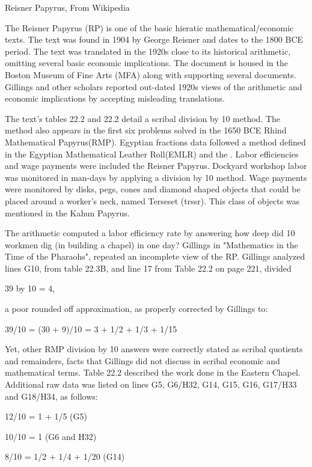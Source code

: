 \documentclass[12pt]{article}
\begin{document}
Reisner Papyrus, From Wikipedia

The Reisner Papyrus (RP) is one of the basic hieratic mathematical/economic texts. The text was found in 1904 by George Reisner and dates to the 1800 BCE period. The text was translated in the 1920s close to its historical arithmetic, omitting several basic economic implications. The document is housed in the Boston Museum of Fine Arts (MFA) along with supporting several documents. Gillings and other scholars reported out-dated 1920s views of the arithmetic and economic implications by accepting misleading translations. 

The text's tables 22.2 and 22.2 detail a scribal division by 10 method. The method also appears in the first six problems solved in the 1650 BCE Rhind Mathematical Papyrus(RMP). Egyptian fractions data followed a method defined in the Egyptian Mathematical Leather Roll(EMLR) and the . Labor efficiencies and wage payments were included the Reisner Papyrus. Dockyard workshop labor was monitored in man-days by applying a division by 10 method. Wage payments were monitored by disks, pegs, cones and diamond shaped objects that could be placed around a worker's neck, named Terseset (trssr). This class of objects was mentioned in the Kahun Papyrus.  

The arithmetic computed a labor efficiency rate by answering how deep did 10 workmen dig (in building a chapel) in one day? Gillings in "Mathematics in the Time of the Pharaohs", repeated an incomplete view of the RP. Gillings analyzed lines G10, from table 22.3B, and line 17 from Table 22.2 on page 221, divided

39 by 10 = 4,

a poor rounded off approximation, as properly corrected by Gillings to:

39/10 = (30 + 9)/10 = 3 + 1/2 + 1/3 + 1/15

Yet, other RMP division by 10 answers were correctly stated as scribal quotients and remainders, facts that Gillings did not discuss in scribal economic and mathematical terms. Table 22.2  described the work done in the Eastern Chapel. Additional raw data was listed on lines G5, G6/H32, G14, G15, G16, G17/H33 and G18/H34, as follows:

12/10 = 1 + 1/5 (G5)

10/10 = 1 (G6 and H32)

8/10 = 1/2 + 1/4 + 1/20 (G14)
\end{document}
